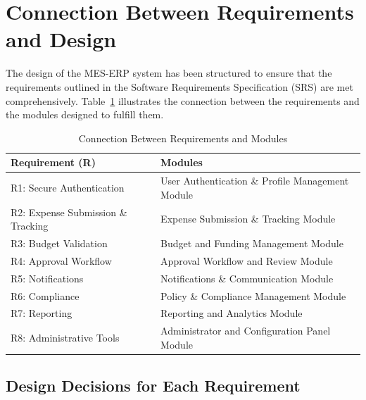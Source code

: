 \documentclass[12pt, titlepage]{article}
\begin{document}
\section{Connection Between Requirements and Design}

The design of the MES-ERP system has been structured to ensure that the requirements outlined in the Software Requirements Specification (SRS) are met comprehensively. Table~\ref{tab:req-to-modules} illustrates the connection between the requirements and the modules designed to fulfill them.

\begin{table}[h!]
\centering
\caption{Connection Between Requirements and Modules}
\label{tab:req-to-modules}
\begin{tabular}{|p{4cm}|p{8cm}|}
\hline
\textbf{Requirement (R)} & \textbf{Modules} \\
\hline
R1: Secure Authentication & User Authentication \& Profile Management Module \\
\hline
R2: Expense Submission \& Tracking & Expense Submission \& Tracking Module \\
\hline
R3: Budget Validation & Budget and Funding Management Module \\
\hline
R4: Approval Workflow & Approval Workflow and Review Module \\
\hline
R5: Notifications & Notifications \& Communication Module \\
\hline
R6: Compliance & Policy \& Compliance Management Module \\
\hline
R7: Reporting & Reporting and Analytics Module \\
\hline
R8: Administrative Tools & Administrator and Configuration Panel Module \\
\hline
\end{tabular}
\end{table}

\subsection{Design Decisions for Each Requirement}
\end{document}
